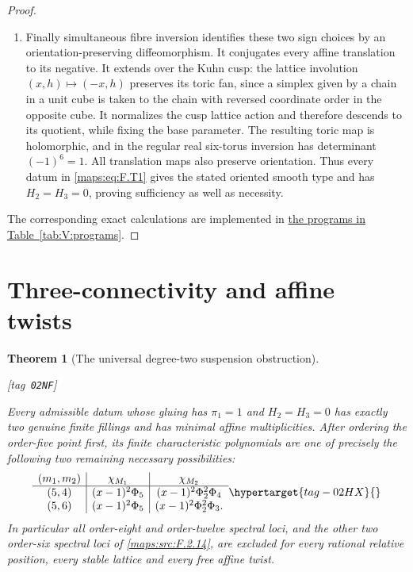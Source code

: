 \documentclass[11pt,a4paper]{article}
\numberwithin{equation}{section}
\newtheorem{theorem}{Theorem}[section]
\theoremstyle{definition}
\newcommand{\StatementRecord}[4]{{\upshape\footnotesize[tag~\texttt{#3}]}\enspace\ignorespaces}
\begin{document}
\begin{proof}
\begin{enumerate}[label=\arabic*.]
\item Finally simultaneous fibre inversion identifies these two
sign choices by an orientation-preserving diffeomorphism.
It conjugates every affine translation to its negative.
It extends over the Kuhn cusp: the lattice involution
$(x,h)\mapsto(-x,h)$ preserves its toric fan, since a
simplex given by a chain in a unit cube is taken to the
chain with reversed coordinate order in the opposite cube.
It normalizes the cusp lattice action and therefore descends
to its quotient, while fixing the base parameter.  The resulting toric map is holomorphic,
and in the regular real six-torus inversion has determinant
$(-1)^6=1$.  All translation maps also preserve orientation.
Thus every datum in \eqref{maps:eq:F.T1} gives the stated oriented smooth
type and has $H_2=H_3=0$, proving sufficiency as well as
necessity.

\end{enumerate}
The corresponding exact calculations are implemented in \hyperlink{prog:V:twists}{the programs in Table~\ref*{tab:V:programs}}.
\end{proof}




\section{Three-connectivity and affine twists}\label{pub:V:sec-connectivity}

\begin{theorem}[The universal degree-two suspension obstruction]\hypertarget{tag-02NF}{}\label{maps:src:F.2.25}
\StatementRecord{maps:src:F.2.25}{proved}{02NF}{\cref{maps:src:F.2.14}, \cref{maps:src:F.2.7}, \cref{maps:src:F.2.9}, \cref{maps:src:F.2.17}, \cref{maps:src:F.2.12}, \eqref{maps:eq:F.T4}, \eqref{maps:eq:F.S3}, \eqref{maps:eq:F.S6}, \cref{maps:src:E.1.3}, \eqref{maps:eq:F.S2}, \eqref{maps:eq:F.S7}, \eqref{maps:eq:F.S5}, \eqref{maps:eq:F.S8}}


Every admissible datum whose gluing has $\pi_1=1$ and $H_2=H_3=0$ has
exactly two genuine finite fillings and has minimal affine
multiplicities.  After ordering the order-five point first,
its finite characteristic polynomials are one of precisely
the following two remaining necessary possibilities:
\begin{equation}
\begin{array}{c|c|c}
 (m_1,m_2)&\chi_{M_1}&\chi_{M_2}\\\hline
 (5,4)&(x-1)^2\Phi_5&(x-1)^2\Phi_2^2\Phi_4\\
 (5,6)&(x-1)^2\Phi_5&(x-1)^2\Phi_2^2\Phi_3.
\end{array}
 \hypertarget{tag-02HX}{}\label{maps:eq:F.S1}
\end{equation}
In particular all order-eight and order-twelve spectral
loci, and the other two order-six spectral loci of \ref{maps:src:F.2.14},
are excluded for every rational relative position, every
stable lattice and every free affine twist.

\end{theorem}
\end{document}

